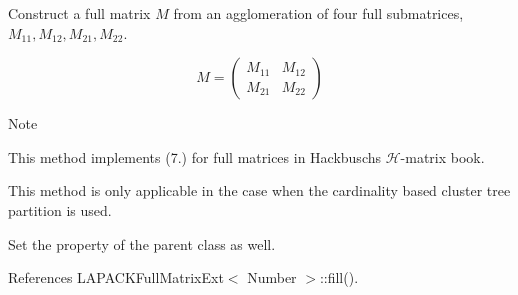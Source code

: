 Construct a full matrix $M$ from an agglomeration of four full submatrices, $M_{11}, M_{12}, M_{21}, M_{22}$.

\[ M = \begin{pmatrix} M_{11} & M_{12} \\ M_{21} & M_{22} \end{pmatrix} \]


\begin{DoxyDescription}
\item[Note ]
\begin{DoxyEnumerate}
\item This method implements (7.) for full matrices in Hackbusch\textquotesingle{}s $\mathcal{H}$-\/matrix book.
\item This method is only applicable in the case when the cardinality based cluster tree partition is used.  
\end{DoxyEnumerate}
\end{DoxyDescription}Set the property of the parent class as well.

References L\+A\+P\+A\+C\+K\+Full\+Matrix\+Ext$<$ Number $>$\+::fill().

\mbox{\label{classLAPACKFullMatrixExt_a4baa5d6642259df28cf9f32cb6b71a25}} 
